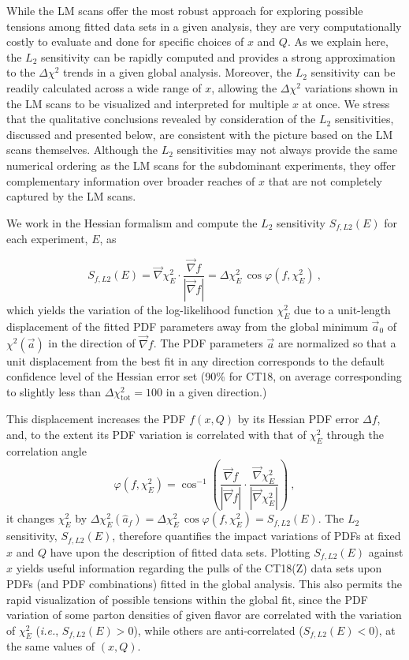 While the LM scans offer the most robust approach for exploring
possible tensions among fitted data sets in a given analysis, they are
very computationally costly to evaluate and 
done for specific choices of $x$ and $Q$.
As we explain here, the $L_2$ sensitivity can be rapidly
computed and provides a strong approximation to the $\Delta \chi^2$
trends in
a given global analysis. Moreover, the $L_2$ sensitivity can be
readily calculated across a wide range of $x$, allowing the $\Delta \chi^2$
variations shown in the LM scans to be visualized and interpreted
for multiple $x$ at once. We stress that the qualitative conclusions
revealed by consideration of the $L_2$ sensitivities, discussed and
presented below, are consistent with the picture based on the LM
scans themselves.
Although the $L_2$ sensitivities may not always provide the same
numerical ordering as the LM scans for the subdominant experiments,
they offer complementary information over broader reaches of $x$
that are not completely captured by the LM scans.


We work in the Hessian formalism \cite{Pumplin:2002vw,Nadolsky:2008zw,Pumplin:2001ct} and compute the $L_2$ sensitivity $S_{f, L2}(E)$ for each experiment, $E$, as

\begin{equation}
S_{f, L2}(E) = \vec{\nabla} \chi^2_E \cdot \frac{ \vec{\nabla} f } { |\vec{\nabla} f| }
             = \Delta \chi^2_E\, \cos \varphi (f, \chi^2_E)\ ,
\label{eq:L2}
\end{equation}
which yields the variation of the log-likelihood function $\chi^2_E$ due to a unit-length
displacement of the fitted PDF parameters away from the global minimum $\vec{a}_0$ of
$\chi^2(\vec{a})$  in the direction of $\vec{\nabla}f$. 
The PDF parameters $\vec a$ are normalized so that a unit displacement
from the best fit in any direction corresponds to the default
confidence level of the Hessian error set (90\% for CT18,
on average corresponding to slightly less than
$\Delta\chi^2_{\textrm{tot}}=100$ in a given direction.)

This displacement increases the
PDF $f(x,Q)$ by its Hessian PDF error $\Delta f$, and, to the extent its
PDF variation is correlated with that of $\chi^2_E$ through the correlation angle
\begin{equation}
	\varphi(f, \chi^2_E) = \cos^{-1} \left( \frac{\vec{\nabla} f}{|\vec{\nabla} f |} \cdot \frac{\vec{\nabla} \chi^2_E}{|\vec{\nabla} \chi^2_E |} \right)\ ,
\end{equation}
it changes $\chi^2_E$ by $\Delta \chi^2_E (\hat{a}_f) = \Delta \chi^2_E\, \cos \varphi (f, \chi^2_E) = S_{f, L2}(E)$.
The $L_2$ sensitivity, $S_{f, L2}(E)$, therefore quantifies the impact variations of PDFs
at fixed $x$ and $Q$ have upon the description of fitted data sets.  Plotting $S_{f, L2}(E)$
against $x$ yields useful information regarding the pulls of the CT18(Z) data sets 
upon PDFs (and PDF combinations) fitted in the global analysis. This also permits
the rapid visualization of possible tensions within the global fit, since
the PDF variation of some parton densities of given flavor are correlated with the
variation of $\chi^2_E$ ({\it i.e.}, $S_{f, L2}(E) > 0$), while others are
anti-correlated ($S_{f, L2}(E) < 0$), at the same values of $(x, Q)$.

